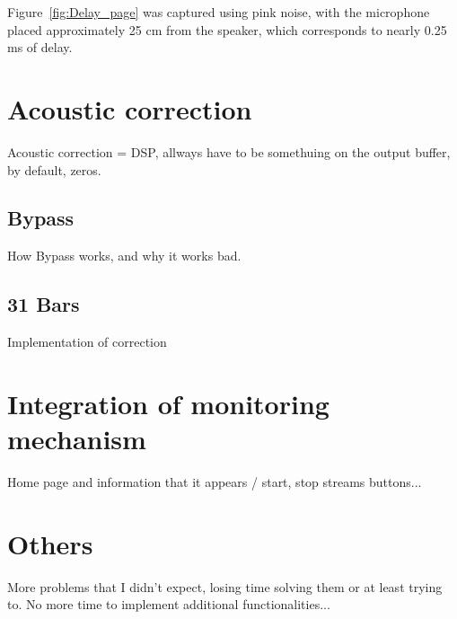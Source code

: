Figure~\ref{fig:Delay_page} was captured using pink noise, with the microphone placed approximately 25 cm from the speaker, which corresponds to nearly 0.25 ms of delay.


\section{Acoustic correction}

Acoustic correction = DSP, allways have to be somethuing on the output buffer, by default, zeros.

\subsection{Bypass}

How Bypass works, and why it works bad.

\subsection{31 Bars}

Implementation of correction

\section{Integration of monitoring mechanism}

Home page and information that it appears / start, stop streams buttons...

\section{Others}

More problems that I didn't expect, losing time solving them or at least trying to. No more time to implement additional functionalities...